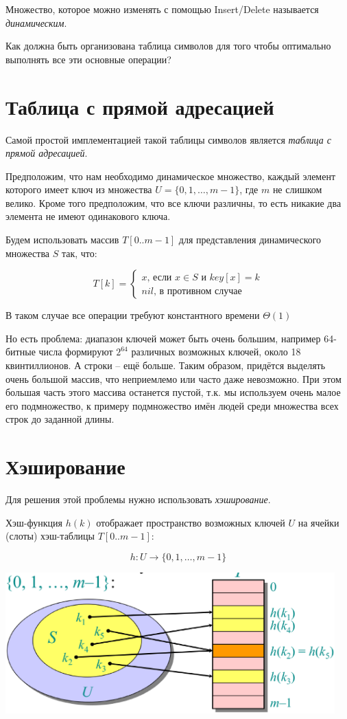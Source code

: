 \documentclass[a4paper,11pt]{article}
\begin{document}
Множество, которое можно изменять с помощью Insert/Delete называется
\emph{динамическим}.

Как должна быть организована таблица символов для того чтобы оптимально
выполнять все эти основные операции?

\section{Таблица с прямой адресацией}
Самой простой имплементацией такой таблицы символов является \emph{таблица с
  прямой адресацией}.

Предположим, что нам необходимо динамическое множество, каждый элемент которого
имеет ключ из множества $U = \lbrace 0, 1, \ldots, m - 1 \rbrace$, где $m$ не
слишком велико. Кроме того предположим, что все ключи различны, то есть никакие
два элемента не имеют одинакового ключа.

Будем использовать массив $T[0 .. m - 1]$ для представления динамического
множества $S$ так, что:

$$ 
T[k] = \begin{cases} x \text{, если } x \in S \text{ и } key[x] = k \\
  nil \text{, в противном случае}
\end{cases}
$$

В таком случае все операции требуют константного времени $\Theta(1)$

Но есть проблема: диапазон ключей может быть очень большим, например 64-битные
числа формируют $2^64$ различных возможных ключей, около 18 квинтиллионов. А
строки -- ещё больше. Таким образом, придётся выделять очень большой массив, что
неприемлемо или часто даже невозможно. При этом большая часть этого массива
останется пустой, т.к. мы используем очень малое его подмножество, к примеру
подмножество имён людей среди множества всех строк до заданной длины.

\section{Хэширование}

Для решения этой проблемы нужно использовать \emph{хэширование}.

Хэш-функция $h(k)$ отображает пространство возможных ключей $U$ на ячейки
(слоты) хэш-таблицы $T[0 .. m - 1]$:

$$
h \colon U \to \lbrace 0, 1, \ldots, m - 1 \rbrace
$$

\includegraphics[width=5in]{lecture7/mapping.eps}
\end{document}
